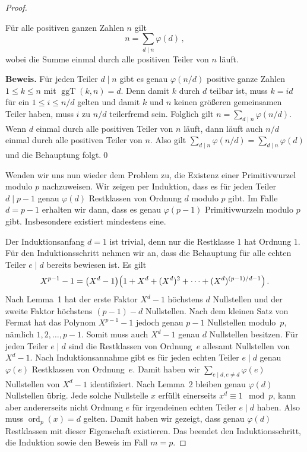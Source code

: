 \begin{proof}
	\begin{satzmitnamen}[Lemma~2]
		Für alle positiven ganzen Zahlen $n$ gilt
		\begin{equation*}
			n=\sum_{d\mid n}\varphi(d)\,,
		\end{equation*}
		wobei die Summe einmal durch alle positiven Teiler von $n$ läuft.
	\end{satzmitnamen}
	\textbf{Beweis.} Für jeden Teiler $d\mid n$ gibt es genau $\varphi(n/d)$ positive ganze Zahlen $1\leqslant k\leqslant n$ mit $\operatorname{ggT}(k,n)=d$. Denn damit $k$ durch $d$ teilbar ist, muss $k=id$ für ein $1\leqslant i\leqslant n/d$ gelten und damit $k$ und $n$ keinen größeren gemeinsamen Teiler haben, muss $i$ zu $n/d$ teilerfremd sein. Folglich gilt $n=\sum_{d\mid n}\varphi(n/d)$. Wenn $d$ einmal durch alle positiven Teiler von $n$ läuft, dann läuft auch $n/d$ einmal durch alle positiven Teiler von $n$. Also gilt $\sum_{d\mid n}\varphi(n/d)=\sum_{d\mid n}\varphi(d)$ und die Behauptung folgt.\qed
	
	Wenden wir uns nun wieder dem Problem zu, die Existenz einer Primitivwurzel modulo $p$ nachzuweisen. Wir zeigen per Induktion, dass es für jeden Teiler $d\mid p-1$ genau $\varphi(d)$ Restklassen von Ordnung $d$ modulo $p$ gibt. Im Falle $d=p-1$ erhalten wir dann, dass es genau $\varphi(p-1)$ Primitivwurzeln modulo $p$ gibt. Insbesondere existiert mindestens eine.
	
	Der Induktionsanfang $d=1$ ist trivial, denn nur die Restklasse $1$ hat Ordnung $1$. Für den Induktionsschritt nehmen wir an, dass die Behauptung für alle echten Teiler $e\mid d$ bereits bewiesen ist. Es gilt
	\begin{equation*}
		X^{p-1}-1= \parens*{X^d-1}\parens*{1+X^d+(X^d)^2+\dotsb+(X^d)^{(p-1)/d-1}}\,.
	\end{equation*}
	Nach Lemma~1 hat der erste Faktor $X^d-1$ höchstens $d$ Nullstellen und der zweite Faktor höchstens $(p-1)-d$ Nullstellen. Nach dem kleinen Satz von Fermat hat das Polynom $X^{p-1}-1$ jedoch genau $p-1$ Nullstellen modulo~$p$, nämlich $1,2,\dotsc,p-1$. Somit muss auch $X^d-1$ genau $d$ Nullstellen besitzen. Für jeden Teiler $e\mid d$ sind die Restklassen von Ordnung~$e$ allesamt Nullstellen von $X^d-1$. Nach Induktionsannahme gibt es für jeden echten Teiler $e\mid d$ genau $\varphi(e)$ Restklassen von Ordnung~$e$. Damit haben wir $\sum_{e\mid d,e\neq d}\varphi(e)$ Nullstellen von $X^d-1$ identifiziert. Nach Lemma~2 bleiben genau $\varphi(d)$ Nullstellen übrig. Jede solche Nullstelle $x$ erfüllt einerseits $x^d\equiv 1\mod p$, kann aber andererseits nicht Ordnung $e$ für irgendeinen echten Teiler $e\mid d$ haben. Also muss $\operatorname{ord}_p(x)=d$ gelten. Damit haben wir gezeigt, dass genau $\varphi(d)$ Restklassen mit dieser Eigenschaft existieren. Das beendet den Induktionsschritt, die Induktion sowie den Beweis im Fall $m=p$.
	

\end{proof}
